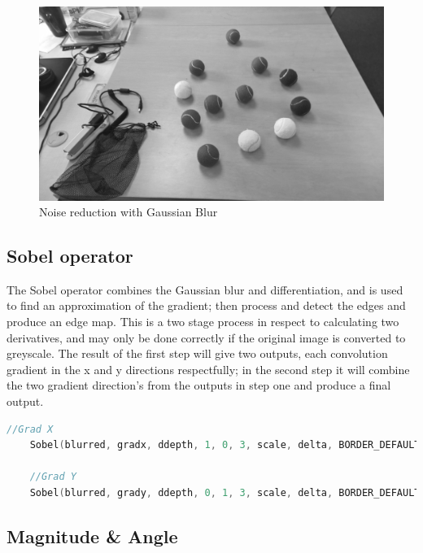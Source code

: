 \documentclass[a4paper, 10pt]{article}
\begin{document}
\begin{figure}[H]
  \includegraphics[width=\linewidth]{images/Blurred}
  \caption{Noise reduction with Gaussian Blur}
  \label{fig:Noise reduction with Gaussian Blur}
\end{figure}


\subsection{Sobel operator}

The Sobel operator combines the Gaussian blur and differentiation, and is used to find an approximation of the gradient; then process and detect the edges and produce an edge map. This is a two stage process in respect to calculating two derivatives, and may only be done correctly if the original image is converted to greyscale. The result of the first step will give two outputs, each convolution gradient in the x and y directions respectfully; in the second step it will combine the two gradient direction's from the outputs in step one and produce a final output.

\begin{lstlisting}[language = C++]
	//Grad X
	Sobel(blurred, gradx, ddepth, 1, 0, 3, scale, delta, BORDER_DEFAULT);

	//Grad Y
	Sobel(blurred, grady, ddepth, 0, 1, 3, scale, delta, BORDER_DEFAULT);
\end{lstlisting}

\clearpage
\subsection{Magnitude \& Angle}
\end{document}
